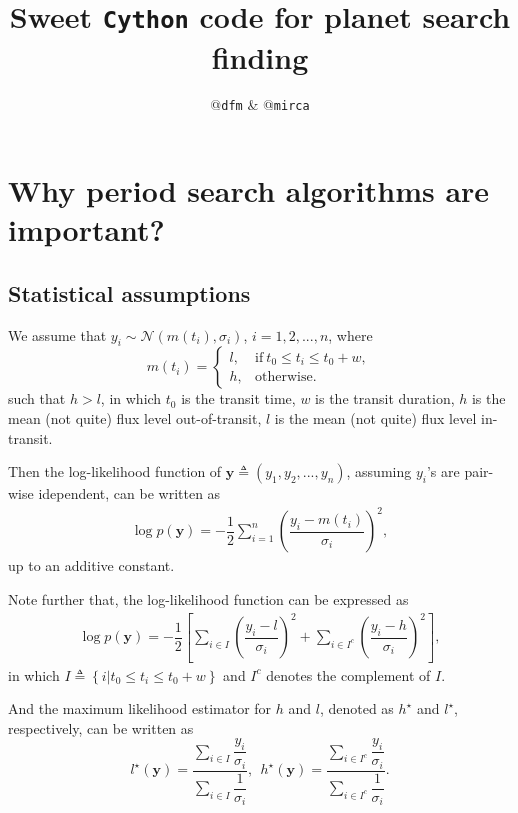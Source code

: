 \documentclass{article}
\title{Sweet \texttt{Cython} code for planet search finding}
\author{@\texttt{dfm} \& @\texttt{mirca}}
\begin{document}
\maketitle
\section{Why period search algorithms are important?}
\subsection{Statistical assumptions}
We assume that $y_i \sim \mathcal{N}(m(t_i), \sigma_i)$, $i=1, 2, ..., n$, where
\begin{equation}
m(t_i) =
\left\{
    \begin{array}{ll}
        l, & \text{if}~t_0 \leq t_i \leq t_0 + w ,\\
        h, & \text{otherwise}.
    \end{array}
\right.
\end{equation}
such that $h>l$, in which $t_0$ is the transit time, $w$ is the transit duration,
$h$ is the mean (not quite) flux level out-of-transit, $l$ is the mean (not quite)
flux level in-transit.

Then the log-likelihood function of $\bm{y} \triangleq (y_1, y_2, ..., y_n)$,
assuming $y_i$'s are pair-wise idependent, can be written as
\begin{align}
    \log p(\bm{y}) = -\dfrac{1}{2}\sum_{i=1}^{n}\left(\dfrac{y_i - m(t_i)}{\sigma_i}\right)^2,
\end{align}
up to an additive constant.

Note further that, the log-likelihood function can be expressed as
\begin{align}
    \log p(\bm{y}) = -\dfrac{1}{2}\left[\sum_{i \in I}\left(\dfrac{y_i - l}{\sigma_i}\right)^2
                                        + \sum_{i \in I^{c}}\left(\dfrac{y_i - h}{\sigma_i}\right)^2\right],
\end{align}
in which $I\triangleq\left\{i | t_0 \leq t_i \leq t_0 + w \right\}$ and $I^{c}$ denotes the complement of $I$.

And the maximum likelihood estimator for $h$ and $l$, denoted as $h^{\star}$ and $l^{\star}$,
respectively, can be written as
\begin{equation}
    l^{\star}(\bm{y}) = \dfrac{\displaystyle\sum_{i \in I}\dfrac{y_i}{\sigma_i}}{\displaystyle\sum_{i\in I}\dfrac{1}{\sigma_i}},
    ~~h^{\star}(\bm{y}) = \dfrac{\displaystyle\sum_{i \in I^{c}}\dfrac{y_i}{\sigma_i}}{\displaystyle\sum_{i\in I^{c}}\dfrac{1}{\sigma_i}}.
\end{equation}
\end{document}
